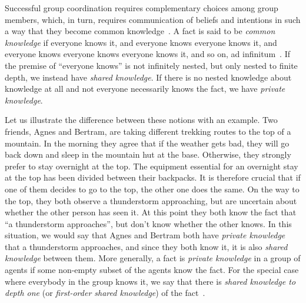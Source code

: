 \documentclass[twocolumn,a4paper,superscriptaddress,nofootinbib]{revtex4}
\begin{document}
Successful group coordination requires complementary choices among group members, which, in turn, requires communication of beliefs and intentions in such a way that they become common knowledge~\citep{fagin1995reasoning}. A fact is said to be \textit{common knowledge} if everyone knows it, and everyone knows everyone knows it, and everyone knows everyone knows everyone knows it, and so on, ad infinitum~\citep{lewis1969convention, clark1981definite, schelling1980strategy, aumann1976agreeing}. If the premise of ``everyone knows'' is not infinitely nested, but only nested to finite depth, we instead have \emph{shared knowledge}. If there is no nested knowledge about knowledge at all and not everyone necessarily knows the fact, we have \emph{private knowledge}.

Let us illustrate the difference between these notions with an example. Two friends, Agnes and Bertram, are taking different trekking routes to the top of a mountain. In the morning they agree that if the weather gets bad, they will go back down and sleep in the mountain hut at the base. Otherwise, they strongly prefer to stay overnight at the top. The equipment essential for an overnight stay at the top has been divided between their backpacks. It is therefore crucial that if one of them decides to go to the top, the other one does the same. On the way to the top, they both observe a thunderstorm approaching, but are uncertain about whether the other person has seen it. At this point they both know the fact that ``a thunderstorm approaches'', but don't know whether the other knows. In this situation, we would say that Agnes and Bertram both have \emph{private knowledge} that a thunderstorm approaches, and since they both know it, it is also \emph{shared knowledge} between them. More generally, a fact is \emph{private knowledge} in a group of agents if some non-empty subset of the agents know the fact. For the special case where everybody in the group knows it, we say that there is \emph{shared knowledge to depth one} (or \emph{first-order shared knowledge}) of the fact~\citep{clark1981definite}.
\end{document}
